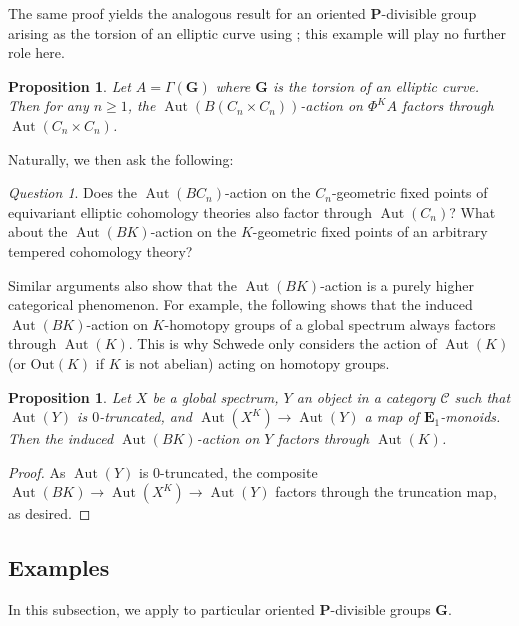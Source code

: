 \documentclass[11pt, a4paper]{article}
\newcommand{\1}{\mathbf{1}}
\DeclareMathOperator{\Aut}{Aut}
\newcommand{\calC}{\mathcal{C}}
\newcommand{\E}{\mathbf{E}}
\newcommand{\G}{\mathbf{G}}
\renewcommand{\P}{\mathbf{P}}
\newcommand{\Ga}{\Gamma}
\theoremstyle{plain}
\newtheorem{prop}[equation]{Proposition}
\theoremstyle{definition}
\theoremstyle{remark}\numberwithin{equation}{section}
\newtheorem{question}[equation]{Question}
\begin{document}
The same proof yields the analogous result for an oriented $\P$-divisible group arising as the torsion of an elliptic curve using ; this example will play no further role here.

\begin{prop}\label{pr:no_action_conflicts_part2_ellipticcurves}
    Let $A =\Ga(\G)$ where $\G$ is the torsion of an elliptic curve. Then for any $n\geq 1$, the $\Aut(B(C_n \times C_n))$-action on $\Phi^K A$ factors through $\Aut(C_n \times C_n)$.
\end{prop}

Naturally, we then ask the following:

\begin{question}
    Does the $\Aut(BC_n)$-action on the $C_n$-geometric fixed points of equivariant elliptic cohomology theories also factor through $\Aut(C_n)$? What about the $\Aut(BK)$-action on the $K$-geometric fixed points of an arbitrary tempered cohomology theory?
\end{question}

Similar arguments also show that the $\Aut(BK)$-action is a purely higher categorical phenomenon. For example, the following shows that the induced $\Aut(BK)$-action on $K$-homotopy groups of a global spectrum always factors through $\Aut(K)$. This is why Schwede \cite{s} only considers the action of $\Aut(K)$ (or $\mathrm{Out}(K)$ if $K$ is not abelian) acting on homotopy groups.

\begin{prop}\label{pr:1categorical_argurment}
    Let $X$ be a global spectrum, $Y$ an object in a category $\calC$ such that $\Aut(Y)$ is $0$-truncated, and $\Aut(X^K) \to \Aut(Y)$ a map of $\E_1$-monoids. Then the induced $\Aut(BK)$-action on $Y$ factors through $\Aut(K)$.
\end{prop}

\begin{proof}
    As $\Aut(Y)$ is $0$-truncated, the composite $\Aut(BK) \to \Aut(X^K) \to \Aut(Y)$ factors through the truncation map, as desired.
\end{proof}

\subsection{Examples}\label{ssec:examples}
In this subsection, we apply  to particular oriented $\P$-divisible groups $\G$.
\end{document}
